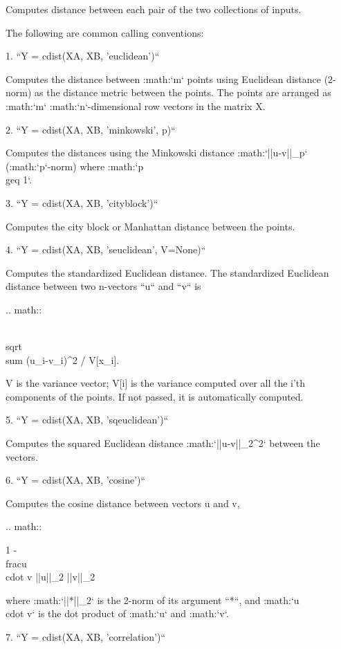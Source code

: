 \begin{DoxyVerb}Computes distance between each pair of the two collections of inputs.

The following are common calling conventions:

1. ``Y = cdist(XA, XB, 'euclidean')``

   Computes the distance between :math:`m` points using
   Euclidean distance (2-norm) as the distance metric between the
   points. The points are arranged as :math:`m`
   :math:`n`-dimensional row vectors in the matrix X.

2. ``Y = cdist(XA, XB, 'minkowski', p)``

   Computes the distances using the Minkowski distance
   :math:`||u-v||_p` (:math:`p`-norm) where :math:`p \\geq 1`.

3. ``Y = cdist(XA, XB, 'cityblock')``

   Computes the city block or Manhattan distance between the
   points.

4. ``Y = cdist(XA, XB, 'seuclidean', V=None)``

   Computes the standardized Euclidean distance. The standardized
   Euclidean distance between two n-vectors ``u`` and ``v`` is

   .. math::

      \\sqrt{\\sum {(u_i-v_i)^2 / V[x_i]}}.

   V is the variance vector; V[i] is the variance computed over all
   the i'th components of the points. If not passed, it is
   automatically computed.

5. ``Y = cdist(XA, XB, 'sqeuclidean')``

   Computes the squared Euclidean distance :math:`||u-v||_2^2` between
   the vectors.

6. ``Y = cdist(XA, XB, 'cosine')``

   Computes the cosine distance between vectors u and v,

   .. math::

      1 - \\frac{u \\cdot v}
               {{||u||}_2 {||v||}_2}

   where :math:`||*||_2` is the 2-norm of its argument ``*``, and
   :math:`u \\cdot v` is the dot product of :math:`u` and :math:`v`.

7. ``Y = cdist(XA, XB, 'correlation')``


\end{DoxyVerb}
